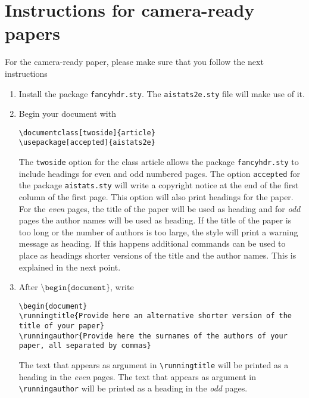 \documentclass[twoside]{article}
\begin{document}
\newpage

\section{Instructions for camera-ready papers}

For the camera-ready paper, please make sure that you follow the next instructions

\begin{enumerate}
    \item Install the package \texttt{fancyhdr.sty}. The
    \texttt{aistats2e.sty} file will make use of it.
    \item Begin your document with
    \begin{flushleft}
    \texttt{\textbackslash documentclass[twoside]\{article\}}\\
    \texttt{\textbackslash usepackage[accepted]\{aistats2e\}}
    \end{flushleft}
    The \texttt{twoside} option for the class article allows the
    package \texttt{fancyhdr.sty} to include headings for even and
    odd numbered pages. The option \texttt{accepted} for the package
    \texttt{aistats.sty} will write a copyright notice at the end of
    the first column of the first page. This option will also print headings for the paper.
    For the \emph{even} pages, the title of the paper will be used as heading and for \emph{odd} pages
    the author names will be used as heading.
    If the title of the paper is too long or the number of authors is too large, the style will print a warning message as heading. If this happens
    additional commands can be used to place as headings shorter versions of the title and the author names. This is explained in the next point.
    \item
    After $\texttt{\textbackslash
    begin\{document\}}$, write
    \begin{flushleft}
    \texttt{\textbackslash begin\{document\}}\\
    \texttt{\textbackslash runningtitle\{Provide here an alternative shorter version of the title of your
    paper\}}\\
    \texttt{\textbackslash runningauthor\{Provide here the surnames of the authors of your paper, all separated by
    commas\}}
    \end{flushleft}
    The text that appears as argument in \texttt{\textbackslash runningtitle}
    will be printed as a heading in the \emph{even} pages. The text that appears as argument in \texttt{\textbackslash runningauthor}
    will be printed as a heading in the \emph{odd} pages.


\end{enumerate}
\end{document}
